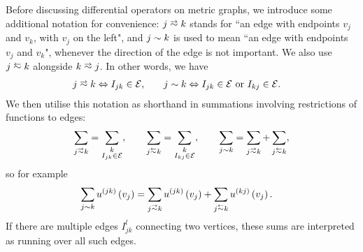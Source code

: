 Before discussing differential operators on metric graphs, we introduce some additional notation for convenience: $j\conLeft k$ stands for ``an edge with endpoints $v_j$ and $v_k$, with $v_j$ on the left", and $j\sim k$ is used to mean ``an edge with endpoints $v_j$ and $v_k$", whenever the direction of the edge is not important.
We also use $j \conRight k$ alongside $k\conLeft j$.
In other words, we have
\begin{align*}
	j\conLeft k \Leftrightarrow I_{jk}\in \edgeSet, &\qquad
	j\con k \Leftrightarrow I_{jk}\in \edgeSet \text{ or } I_{kj}\in \edgeSet.
\end{align*}
We then utilise this notation as shorthand in summations involving restrictions of functions to edges:
\begin{align*}
	\sum_{j\conLeft k} = \sum_{\substack{k \\ I_{jk}\in \edgeSet}}, 
	\qquad 	\sum_{j\conRight k} = \sum_{\substack{k \\ I_{kj}\in \edgeSet}},
	\qquad \sum_{j\con k} = \sum_{j\conLeft k} + \sum_{j\conRight k},
\end{align*}
so for example
\begin{align*}
	\sum_{j\con k}u^{(jk)}\bracs{v_j} &= \sum_{j\conLeft k}u^{(jk)}\bracs{v_j} + \sum_{j\conRight k}u^{(kj)}\bracs{v_j}.
\end{align*}
If there are multiple edges $I_{jk}^l$ connecting two vertices, these sums are interpreted as running over all such edges.

